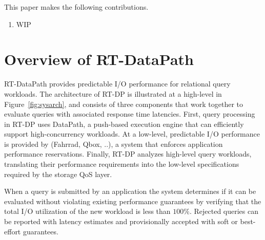 \documentclass{sig-alternate}
\begin{document}
This paper makes the following contributions.

\begin{enumerate}
\item WIP

\end{enumerate}

\section{Overview of RT-DataPath}
\label{sec:overview}

RT-DataPath provides predictable I/O performance for relational query
workloads. The architecture of RT-DP is illustrated at a high-level in
Figure~\ref{fig:sysarch}, and consists of three components that work together
to evaluate queries with associated response time latencies. First, query
processing in RT-DP uses DataPath, a push-based execution engine that can
efficiently support high-concurrency workloads. At a low-level, predictable
I/O performance is provided by (Fahrrad, Qbox, ..), a system that enforces
application performance reservations. Finally, RT-DP analyzes high-level query
workloads, translating their performance requirements into the low-level
specifications required by the storage QoS layer.

When a query is submitted by an application the system determines if it can be
evaluated without violating existing performance guarantees by verifying that
the total I/O utilization of the new workload is less than $100\%$. Rejected
queries can be reported with latency estimates and provisionally accepted with
soft or best-effort guarantees.
\end{document}
